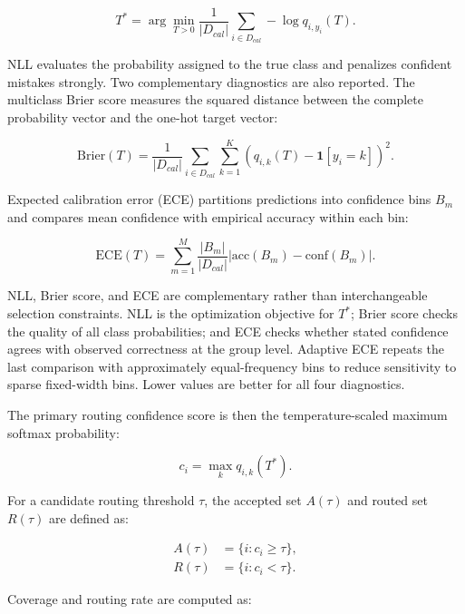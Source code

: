 \documentclass{ieeeaccess}
\begin{document}
\begin{equation}
T^*=\arg\min_{T>0}
\frac{1}{|D_{cal}|}\sum_{i\in D_{cal}} -\log q_{i,y_i}(T).
\label{eq:temperature-nll}
\end{equation}

NLL evaluates the probability assigned to the true class and penalizes confident mistakes strongly. Two complementary diagnostics are also reported. The multiclass Brier score measures the squared distance between the complete probability vector and the one-hot target vector:

\begin{equation}
\mathrm{Brier}(T)=\frac{1}{|D_{cal}|}
\sum_{i\in D_{cal}}\sum_{k=1}^{K}
\left(q_{i,k}(T)-\mathbf{1}[y_i=k]\right)^2.
\label{eq:brier}
\end{equation}

Expected calibration error (ECE) partitions predictions into confidence bins $B_m$ and compares mean confidence with empirical accuracy within each bin:

\begin{equation}
\mathrm{ECE}(T)=\sum_{m=1}^{M}\frac{|B_m|}{|D_{cal}|}
\left|\mathrm{acc}(B_m)-\mathrm{conf}(B_m)\right|.
\label{eq:ece}
\end{equation}

NLL, Brier score, and ECE are complementary rather than interchangeable selection constraints. NLL is the optimization objective for $T^*$; Brier score checks the quality of all class probabilities; and ECE checks whether stated confidence agrees with observed correctness at the group level. Adaptive ECE repeats the last comparison with approximately equal-frequency bins to reduce sensitivity to sparse fixed-width bins. Lower values are better for all four diagnostics.

The primary routing confidence score is then the temperature-scaled maximum softmax probability:

\begin{equation}
c_i=\max_k q_{i,k}(T^*).
\end{equation}

For a candidate routing threshold $\tau$, the accepted set $A(\tau)$ and routed set $R(\tau)$ are defined as:

\begin{align}
A(\tau) &= \{i: c_i \geq \tau\}, \\
R(\tau) &= \{i: c_i < \tau\}.
\end{align}

Coverage and routing rate are computed as:
\end{document}
